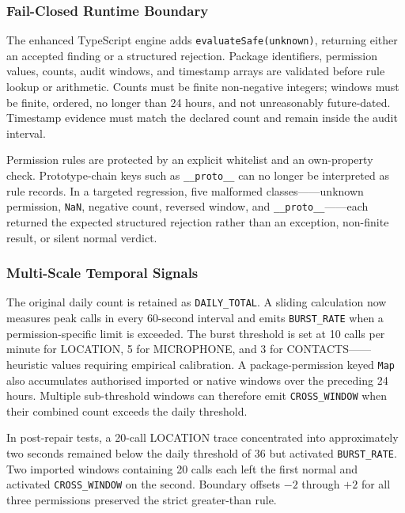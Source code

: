\subsubsection{Fail-Closed Runtime Boundary}

The enhanced TypeScript engine adds \texttt{evaluateSafe(unknown)}, returning either an accepted finding or a structured rejection. Package identifiers, permission values, counts, audit windows, and timestamp arrays are validated before rule lookup or arithmetic. Counts must be finite non-negative integers; windows must be finite, ordered, no longer than 24 hours, and not unreasonably future-dated. Timestamp evidence must match the declared count and remain inside the audit interval.

Permission rules are protected by an explicit whitelist and an own-property check. Prototype-chain keys such as \texttt{\_\_proto\_\_} can no longer be interpreted as rule records. In a targeted regression, five malformed classes——unknown permission, \texttt{NaN}, negative count, reversed window, and \texttt{\_\_proto\_\_}——each returned the expected structured rejection rather than an exception, non-finite result, or silent normal verdict.

\subsubsection{Multi-Scale Temporal Signals}

The original daily count is retained as \texttt{DAILY\_TOTAL}. A sliding calculation now measures peak calls in every 60-second interval and emits \texttt{BURST\_RATE} when a permission-specific limit is exceeded. The burst threshold is set at 10 calls per minute for LOCATION, 5 for MICROPHONE, and 3 for CONTACTS——heuristic values requiring empirical calibration. A package-permission keyed \texttt{Map} also accumulates authorised imported or native windows over the preceding 24 hours. Multiple sub-threshold windows can therefore emit \texttt{CROSS\_WINDOW} when their combined count exceeds the daily threshold.

In post-repair tests, a 20-call LOCATION trace concentrated into approximately two seconds remained below the daily threshold of 36 but activated \texttt{BURST\_RATE}. Two imported windows containing 20 calls each left the first normal and activated \texttt{CROSS\_WINDOW} on the second. Boundary offsets \(-2\) through \(+2\) for all three permissions preserved the strict greater-than rule.


